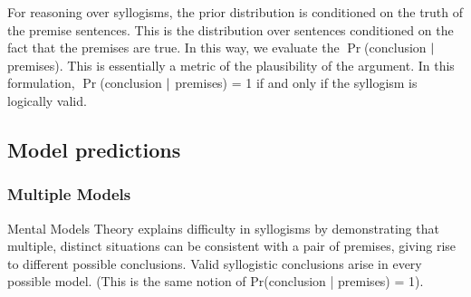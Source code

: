 \documentclass[10pt,letterpaper]{article}
\begin{document}
For reasoning over syllogisms, the prior distribution is conditioned on the truth of the premise sentences. This is the distribution over sentences conditioned on the fact that the premises are true. In this way, we evaluate the $\Pr$(conclusion $\arrowvert$ premises). This is essentially a metric of the plausibility of the argument. In this formulation, $\Pr$(conclusion $\arrowvert$ premises) = 1 if and only if the syllogism is logically valid.

%
%
%
%
%

\subsection{Model predictions}

\subsubsection{Multiple Models}
Mental Models Theory explains difficulty in syllogisms by demonstrating that multiple, distinct situations can be consistent with a pair of premises, giving rise to different possible conclusions. Valid syllogistic conclusions arise in every possible model. (This is the same notion of Pr(conclusion | premises) = 1). 
\end{document}
